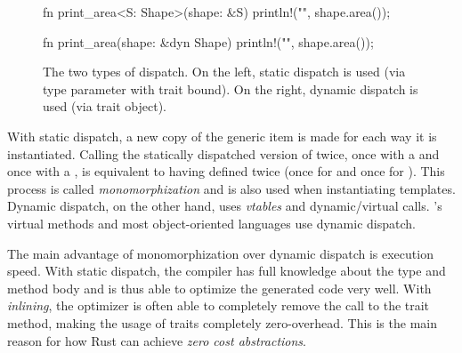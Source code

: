 \begin{figure}[b]
  \centering
    \begin{minipage}[t]{.49\textwidth}
    \begin{rustcode}
      fn print_area<S: Shape>(shape: &S) {
          println!("{}", shape.area());
      }
    \end{rustcode}
  \end{minipage}
  \begin{minipage}[t]{.49\textwidth}
    \begin{rustcode}
      fn print_area(shape: &dyn Shape) {
          println!("{}", shape.area());
      }
    \end{rustcode}
  \end{minipage}
  \caption{
    The two types of dispatch.
    On the left, static dispatch is used (via type parameter with trait bound).
    On the right, dynamic dispatch is used (via trait object).
  }
  \label{fig:dispatch}
\end{figure}

With static dispatch, a new copy of the generic item is made for each way it is instantiated.
Calling the statically dispatched version of  twice, once with a  and once with a , is equivalent to having defined  twice (once for  and once for ).
This process is called \emph{monomorphization} and is also used when instantiating \cpp templates.
Dynamic dispatch, on the other hand, uses \emph{vtables} and dynamic/virtual calls.
\cpp's virtual methods and most object-oriented languages use dynamic dispatch.

The main advantage of monomorphization over dynamic dispatch is execution speed.
With static dispatch, the compiler has full knowledge about the type and method body and is thus able to optimize the generated code very well.
With \emph{inlining}, the optimizer is often able to completely remove the call to the trait method, making the usage of traits completely zero-overhead.
This is the main reason for how Rust can achieve \emph{zero cost abstractions}.

